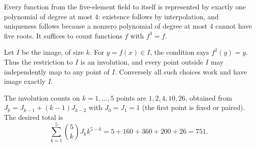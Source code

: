Every function from the five-element field to itself is represented by exactly one polynomial of degree at most $4$: existence follows by interpolation, and uniqueness follows because a nonzero polynomial of degree at most $4$ cannot have five roots. It suffices to count functions $f$ with $f^3=f$.

Let $I$ be the image, of size $k$. For $y=f(x)\in I$, the condition says $f^2(y)=y$. Thus the restriction to $I$ is an involution, and every point outside $I$ may independently map to any point of $I$. Conversely all such choices work and have image exactly $I$.

The involution counts on $k=1,\ldots,5$ points are $1,2,4,10,26$, obtained from $J_k=J_{k-1}+(k-1)J_{k-2}$ with $J_0=J_1=1$ (the first point is fixed or paired). The desired total is
\[
\sum_{k=1}^5\binom5kJ_k k^{5-k}
=5+160+360+200+26=\boxed{751}.
\]
